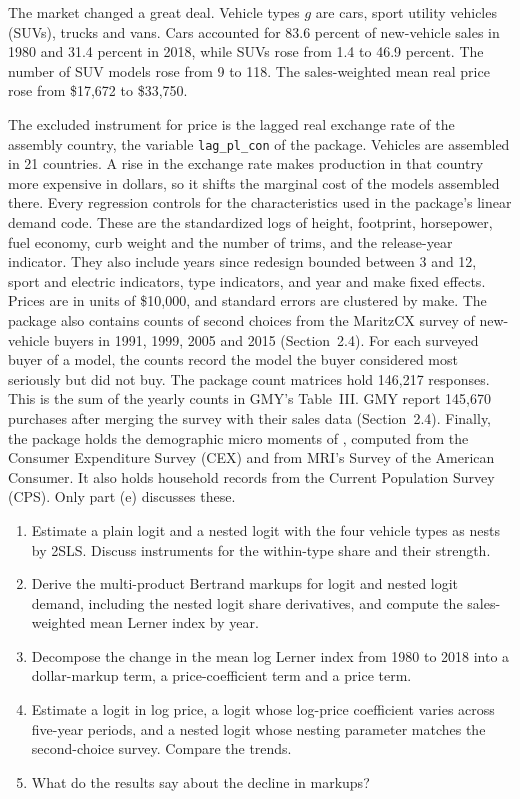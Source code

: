 The market changed a great deal. Vehicle types $g$ are cars, sport utility vehicles (SUVs), trucks and vans. Cars
accounted for 83.6 percent of new-vehicle sales in 1980 and 31.4 percent in 2018, while SUVs rose from 1.4 to 46.9
percent. The number of SUV models rose from 9 to 118. The sales-weighted mean real price rose from \$17,672 to
\$33,750.

The excluded instrument for price is the lagged real exchange rate of the assembly country, the variable
\texttt{lag\_pl\_con} of the package. Vehicles are assembled in 21 countries. A rise in the exchange rate makes
production in that country more expensive in dollars, so it shifts the marginal cost of the models assembled there.
Every regression controls for the characteristics used in the package's linear demand code. These are the
standardized logs of height, footprint, horsepower, fuel economy, curb weight and the number of trims, and the
release-year indicator. They also include years since redesign bounded between 3 and 12, sport and electric indicators,
type indicators, and year and make fixed effects. Prices are in units of \$10,000, and standard errors are clustered by
make. The package also contains counts of second choices from the MaritzCX survey of new-vehicle buyers in 1991, 1999,
2005 and 2015 (Section~2.4). For each surveyed buyer of a model, the counts record the model the buyer considered most
seriously but did not buy. The package count matrices hold 146,217 responses. This is the sum of the yearly counts in GMY's Table~III. GMY report 145,670 purchases after
merging the survey with their sales data (Section~2.4). Finally, the package holds the demographic micro moments of
\citet{GriecoMurryYurukoglu2024}, computed from the Consumer Expenditure Survey (CEX) and from MRI's Survey of the
American Consumer. It also holds household records from the Current Population Survey (CPS). Only part (e) discusses
these.

\begin{enumerate}[label=(\alph*)]
  \item Estimate a plain logit and a nested logit with the four vehicle types as nests by 2SLS. Discuss instruments for
  the within-type share and their strength.
  \item Derive the multi-product Bertrand markups for logit and nested logit demand, including the nested logit share
  derivatives, and compute the sales-weighted mean Lerner index by year.
  \item Decompose the change in the mean log Lerner index from 1980 to 2018 into a dollar-markup term, a
  price-coefficient term and a price term.
  \item Estimate a logit in log price, a logit whose log-price coefficient varies across five-year periods, and a nested
  logit whose nesting parameter matches the second-choice survey. Compare the trends.
  \item What do the results say about the decline in markups?
\end{enumerate}


